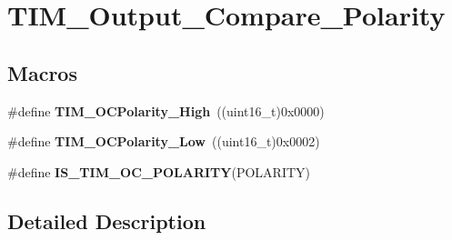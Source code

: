 \hypertarget{group___t_i_m___output___compare___polarity}{\section{T\-I\-M\-\_\-\-Output\-\_\-\-Compare\-\_\-\-Polarity}
\label{group___t_i_m___output___compare___polarity}
}
\subsection*{Macros}
\begin{DoxyCompactItemize}
\item 
\hypertarget{group___t_i_m___output___compare___polarity_gaba2f2de6fd722b8973e0eddeb8644022}{\#define {\bfseries T\-I\-M\-\_\-\-O\-C\-Polarity\-\_\-\-High}~((uint16\-\_\-t)0x0000)}\label{group___t_i_m___output___compare___polarity_gaba2f2de6fd722b8973e0eddeb8644022}

\item 
\hypertarget{group___t_i_m___output___compare___polarity_ga9f4b11953dbd2c6f836b6913469dcf54}{\#define {\bfseries T\-I\-M\-\_\-\-O\-C\-Polarity\-\_\-\-Low}~((uint16\-\_\-t)0x0002)}\label{group___t_i_m___output___compare___polarity_ga9f4b11953dbd2c6f836b6913469dcf54}

\item 
\#define {\bfseries I\-S\-\_\-\-T\-I\-M\-\_\-\-O\-C\-\_\-\-P\-O\-L\-A\-R\-I\-T\-Y}(P\-O\-L\-A\-R\-I\-T\-Y)
\end{DoxyCompactItemize}


\subsection{Detailed Description}


